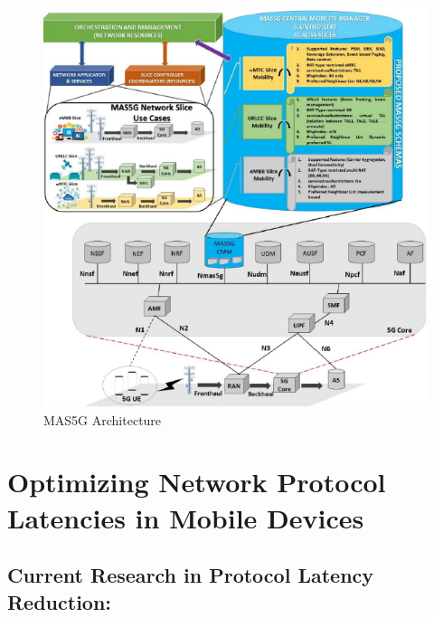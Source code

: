\begin{multicols}{2}


\begin{figure}[H]
\centering
\includegraphics[scale=0.7]{src/Figures/chap1/chap1-fig03.jpg}
\caption{MAS5G Architecture}\label{chap1-fig03}
\end{figure}

\section{Optimizing Network Protocol Latencies in Mobile Devices}

\subsection{Current Research in Protocol Latency Reduction:}


\end{multicols}
